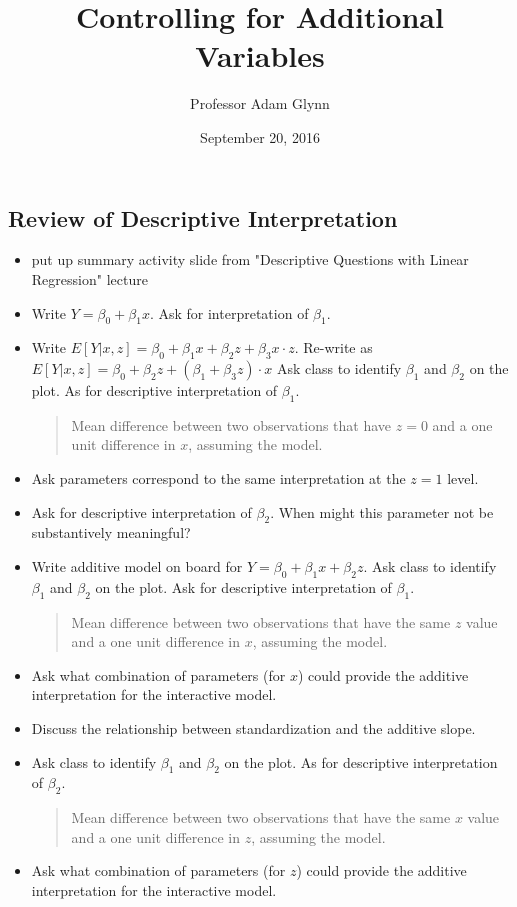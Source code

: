 \documentclass[10pt,letter]{article}
\begin{document}
\title{Controlling for Additional Variables}

\author{Professor Adam Glynn}

\date{September 20, 2016}

\maketitle 
\noindent

\subsection*{Review of Descriptive Interpretation}
\begin{itemize}
\item put up summary activity slide from "Descriptive Questions with Linear Regression" lecture
\item Write $Y = \beta_0 + \beta_1 x$. Ask for interpretation of $\beta_1$.
\item Write $E[Y|x,z] = \beta_0 + \beta_1 x + \beta_2 z + \beta_3 x \cdot z$. Re-write as $E[Y|x,z] = \beta_0 + \beta_2 z  + (\beta_1 + \beta_3 z) \cdot x$
Ask class to identify $\beta_1$ and $\beta_2$ on the plot. As for descriptive interpretation of $\beta_1$. 
\begin{quote}
Mean difference between two observations that have $z=0$ and a one unit difference in $x$, assuming the model.
\end{quote}
\item Ask parameters correspond to the same interpretation at the $z=1$ level.
\item Ask for descriptive interpretation of $\beta_2$. When might this parameter not be substantively meaningful?
\item Write additive model on board for $Y = \beta_0 + \beta_1 x + \beta_2 z$. Ask class to identify $\beta_1$ and $\beta_2$ on the plot. Ask for descriptive interpretation of $\beta_1$. 
\begin{quote}
Mean difference between two observations that have the same $z$ value and a one unit difference in $x$, assuming the model.
\end{quote}
\item Ask what combination of parameters (for $x$) could provide the additive interpretation for the interactive model.
\item Discuss the relationship between standardization and the additive slope.
\item Ask class to identify $\beta_1$ and $\beta_2$ on the plot. As for descriptive interpretation of $\beta_2$. 
\begin{quote}
Mean difference between two observations that have the same $x$ value and a one unit difference in $z$, assuming the model.
\end{quote}
\item Ask what combination of parameters (for $z$) could provide the additive interpretation for the interactive model.
\end{itemize}
\end{document}
